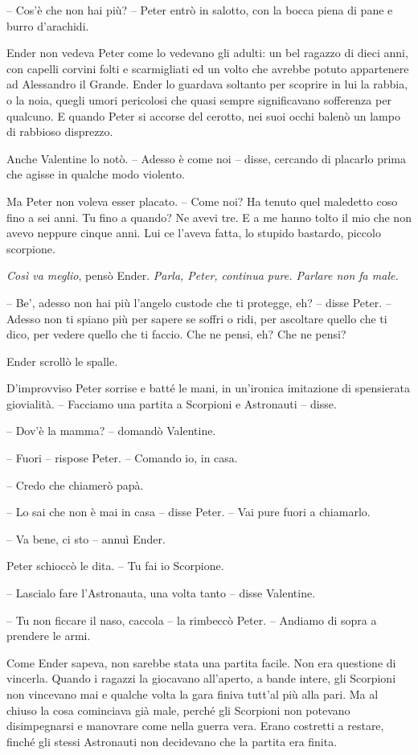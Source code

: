{-- Cos'è che non hai più? -- Peter entrò in salotto, con la bocca piena
	di pane e burro d'arachidi.}

{Ender non vedeva Peter come lo vedevano gli adulti: un bel ragazzo di
	dieci anni, con capelli corvini folti e scarmigliati ed un volto che
	avrebbe potuto appartenere ad Alessandro il Grande. Ender lo guardava
	soltanto per scoprire in lui la rabbia, o la noia, quegli umori
	pericolosi che quasi sempre significavano sofferenza per qualcuno. E
	quando Peter si accorse del cerotto, nei suoi occhi balenò un lampo di
	rabbioso disprezzo.}

{Anche Valentine lo notò. -- Adesso è come noi -- disse, cercando di
	placarlo prima che agisse in qualche modo violento.}

{Ma Peter non voleva esser placato. -- Come noi? Ha tenuto quel
	maledetto coso fino a sei anni. Tu fino a quando? Ne avevi tre. E a me
	hanno tolto il mio che non avevo neppure cinque anni. Lui ce l'aveva
	fatta, lo stupido bastardo, piccolo scorpione.}

\emph{{Così va meglio}}{, \emph{} pensò Ender. \emph{Parla, Peter,
		continua pure. Parlare non fa male.}}

{-- Be', adesso non hai più l'angelo custode che ti protegge, eh? --
	disse Peter. -- Adesso non ti spiano più per sapere se soffri o ridi,
	per ascoltare quello che ti dico, per vedere quello che ti faccio. Che
	ne pensi, eh? Che ne pensi?}

{Ender scrollò le spalle.}

{D'improvviso Peter sorrise e batté le mani, in un'ironica imitazione di
	spensierata giovialità. -- Facciamo una partita a Scorpioni e Astronauti
	-- disse.}

{-- Dov'è la mamma? -- domandò Valentine.}

{-- Fuori -- rispose Peter. -- Comando io, in casa.}

{-- Credo che chiamerò papà.}

{-- Lo sai che non è mai in casa -- disse Peter. -- Vai pure fuori a
	chiamarlo.}

{-- Va bene, ci sto -- annuì Ender.}

{Peter schioccò le dita. -- Tu fai io Scorpione.}

{-- Lascialo fare l'Astronauta, una volta tanto -- disse Valentine.}

{-- Tu non ficcare il naso, caccola -- la rimbeccò Peter. -- Andiamo di
	sopra a prendere le armi.}

{Come Ender sapeva, non sarebbe stata una partita facile. Non era
	questione di vincerla. Quando i ragazzi la giocavano all'aperto, a bande
	intere, gli Scorpioni non vincevano mai e qualche volta la gara finiva
	tutt'al più alla pari. Ma al chiuso la cosa cominciava già male, perché
	gli Scorpioni non potevano disimpegnarsi e manovrare come nella guerra
	vera. Erano costretti a restare, finché gli stessi Astronauti non
	decidevano che la partita era finita.}

